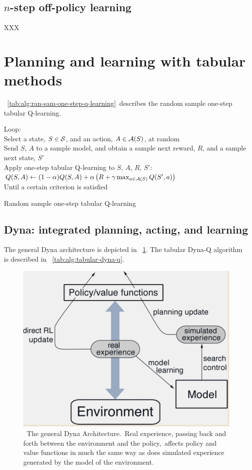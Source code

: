 \subsection{$n$-step off-policy learning}

XXX



\section{Planning and learning with tabular methods}

\tablename~\ref{tab:alg:ran-sam-one-step-q-learning}\ describes the random sample one-step tabular Q-learning.

\begin{table}
\beginalg
Loop:\\
\> Select a state, $S\in\mathcal{S}$, and an action, $A\in\mathcal{A}(S)$, at random\\
\> Send $S$, $A$ to a sample model, and obtain
a sample next reward, $R$, and a sample next state, $S'$\\
\> Apply one-step tabular Q-learning to $S$, $A$, $R$, $S'$:\\
\> \> $Q(S,A) \leftarrow (1-\alpha) Q(S,A) + \alpha \left( R + \gamma \max_{a\in\mathcal{A}(S)}Q(S',a) \right)$\\
Until a certain criterion is satisfied
\endalg
\caption{Random sample one-step tabular Q-learning}
\label{tab:alg:ran-sam-one-step-q-learning}
\end{table}


\subsection{Dyna: integrated planning, acting, and learning}

The general Dyna architecture is depicted in \figurename~\ref{fig:dyna-architecture}.
The tabular Dyna-Q algorithm is described in \tablename~\ref{tab:alg:tabular-dyna-q}.


\begin{figure}
\begin{center}
\includegraphics[width=.5\textwidth]{figures/dyna-architecture}
\end{center}
\caption{\
The general Dyna Architecture.\
Real experience, passing back and forth between the environment and the policy,\
affects policy and value functions in much the same way as does simulated experience generated by the model of the environment.\
}
\label{fig:dyna-architecture}
\end{figure}


